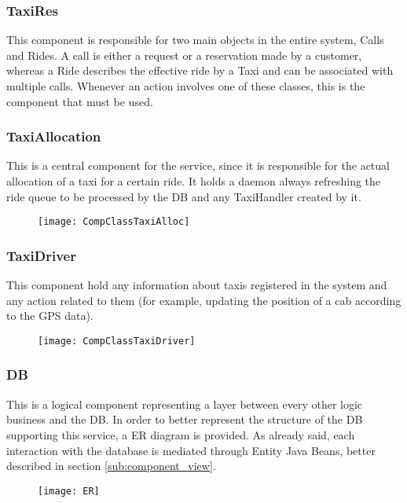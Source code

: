 \newpage
\subsubsection{TaxiRes} %
This component is responsible for two main objects in the entire system, Calls and Rides. A call is either a request or a reservation made by a customer, whereas a Ride describes the effective ride by a Taxi and can be associated with multiple calls. Whenever an action involves one of these classes, this is the component that must be used.
\vfill
\begin{figure}[hb]
    \centering
\end{figure}
\vfill
        
\newpage
\subsubsection{TaxiAllocation} %
This is a central component for the service, since it is responsible for the actual allocation of a taxi for a certain ride. It holds a daemon always refreshing the ride queue to be processed by the DB and any TaxiHandler created by it.
\begin{figure}[h!]
    \centering
    \texttt{[image: CompClassTaxiAlloc]}
\end{figure}

\newpage
\subsubsection{TaxiDriver} %
This component hold any information about taxis registered in the system and any action related to them (for example, updating the position of a cab according to the GPS data).
\begin{figure}[hb]
    \centering
    \texttt{[image: CompClassTaxiDriver]}
\end{figure}

\newpage
\subsubsection{DB} %
\label{par:db}
This is a logical component representing a layer between every other logic business and the DB. In order to better represent the structure of the DB supporting this service, a ER diagram is provided. As already said, each interaction with the database is mediated through Entity Java Beans, better described in section \ref{sub:component_view}.
\begin{figure}[h!]
    \centering
    \texttt{[image: ER]}
\end{figure}

